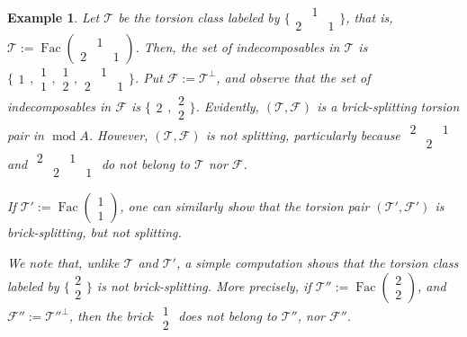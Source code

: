 \documentclass{amsart}
\theoremstyle{thmstyle}
\theoremstyle{exstyle}
\newtheorem{example}[thm]{Example}
\theoremstyle{defstyle}
\theoremstyle{remstyle}
\theoremstyle{remstyle}
\newcommand{\Fac}{\operatorname{Fac}}
\DeclareMathOperator*{\modu}{mod}
\begin{document}
\begin{example}
Let $\mathcal{T}$ be the torsion class labeled by $\{{\begin{smallmatrix} & 1& \\2& &1\end{smallmatrix}}\}$, that is, $\mathcal{T}:=\Fac({\begin{smallmatrix} & 1& \\2& &1\end{smallmatrix}})$. Then, the set of indecomposables in $\mathcal{T}$ is $\{{\begin{smallmatrix} 1\end{smallmatrix}}, {\begin{smallmatrix} 1\\1\end{smallmatrix}}, {\begin{smallmatrix} 1\\2\end{smallmatrix}}, {\begin{smallmatrix} & 1& \\2& &1\end{smallmatrix}}\}$. Put $\mathcal{F}:=\mathcal{T}^\perp$, and observe that the set of indecomposables in $\mathcal{F}$ is $\{{\begin{smallmatrix} 2\end{smallmatrix}}, {\begin{smallmatrix} 2\\2\end{smallmatrix}}\}$. 
Evidently, $(\mathcal{T},\mathcal{F})$ is a brick-splitting torsion pair in $\modu A$. However, $(\mathcal{T},\mathcal{F})$ is not splitting, particularly because ${\begin{smallmatrix} 2& &1 \\ &2& \end{smallmatrix}}$ and ${\begin{smallmatrix} 2& &1& \\ &2& &1 \end{smallmatrix}}$ do not belong to $\mathcal{T}$ nor $\mathcal{F}$. 

If $\mathcal{T}':=\Fac({\begin{smallmatrix} 1\\1\end{smallmatrix}})$, one can similarly show that the torsion pair $(\mathcal{T}',\mathcal{F}')$ is brick-splitting, but not splitting.

We note that, unlike $\mathcal{T}$ and $\mathcal{T}'$, a simple computation shows that the torsion class labeled by $\{{\begin{smallmatrix} 2\\2\end{smallmatrix}}\}$ is not brick-splitting. More precisely, if $\mathcal{T}'':=\Fac({\begin{smallmatrix} 2\\2\end{smallmatrix}})$, and $\mathcal{F}'':=\mathcal{T}''^\perp$, then the brick ${\begin{smallmatrix} 1\\2\end{smallmatrix}}$ does not belong to $\mathcal{T}''$, nor $\mathcal{F}''$.


\end{example}
\end{document}
